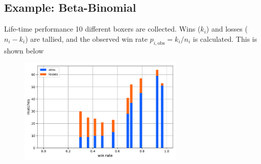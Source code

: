 \subsection{Example: Beta-Binomial}
Life-time performance 10 different boxers are collected. Wins ($k_i$) and losses ($n_i - k_i$) are tallied, and the observed win rate $p_{i,\text{obs}} = k_i / n_i$ is calculated. This is shown below
\begin{figure}[h]
\centering
	\includegraphics[width=0.7\textwidth]{./figs/04-betabinom-data.pdf}
\end{figure}

